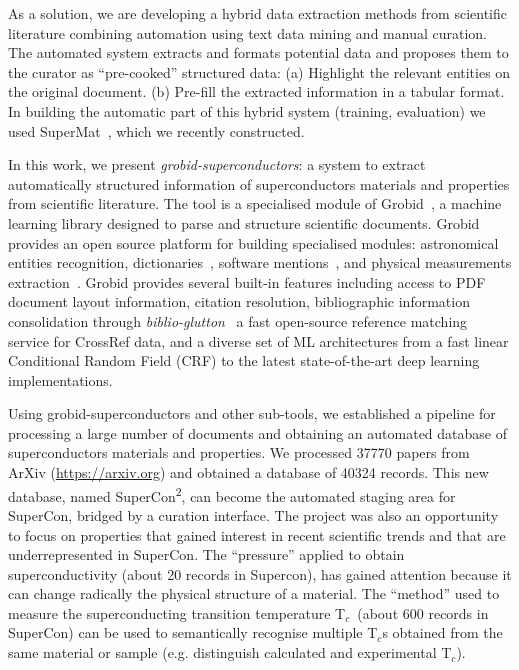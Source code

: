 \documentclass[]{interact}
\theoremstyle{plain}%
\theoremstyle{definition}
\theoremstyle{remark}
\newcommand{\tc}{T$_{c}$}
\begin{document}
As a solution, we are developing a hybrid data extraction methods from scientific literature combining automation using text data mining and manual curation.
The automated system extracts and formats potential data and proposes them to the curator as ``pre-cooked'' structured data: (a) Highlight the relevant entities on the original document. 
(b) Pre-fill the extracted information in a tabular format.
In building the automatic part of this hybrid system (training, evaluation) we used SuperMat~\cite{foppiano2021supermat}, which we recently constructed. 

In this work, we present \textit{grobid-superconductors}: a system to extract automatically structured information of superconductors materials and properties from scientific literature. 
The tool is a specialised module of Grobid~\cite{GROBID}, a machine learning library designed to parse and structure scientific documents. 
Grobid provides an open source platform for building specialised modules: astronomical entities recognition\cite{grobid-astro}, dictionaries~\cite{khemakhem:hal-01508868}, software mentions~\cite{lopez2021mining}, and physical measurements extraction~\cite{foppiano2019quantities}.
Grobid provides several built-in features including access to PDF document layout information, citation resolution, bibliographic information consolidation through \textit{biblio-glutton}~\cite{biblio-glutton-lookup} a fast open-source reference matching service for CrossRef data, and a diverse set of ML architectures from a fast linear Conditional Random Field (CRF) to the latest state-of-the-art deep learning implementations.

Using grobid-superconductors and other sub-tools, we established a pipeline for processing a large number of documents and obtaining an automated database of superconductors materials and properties. 
We processed 37770 papers from ArXiv (\url{https://arxiv.org}) and obtained a database of 40324 records. 
This new database, named SuperCon\textsuperscript{2}, can become the automated staging area for SuperCon, bridged by a curation interface. 
The project was also an opportunity to focus on properties that gained interest in recent scientific trends and that are underrepresented in SuperCon. 
The ``pressure'' applied to obtain superconductivity (about 20 records in Supercon), has gained attention because it can change radically the physical structure of a material.
The ``method'' used to measure the superconducting transition temperature \tc~(about 600 records in SuperCon) can be used to semantically recognise multiple \tc s obtained from the same material or sample (e.g. distinguish calculated and experimental \tc). 
\end{document}
